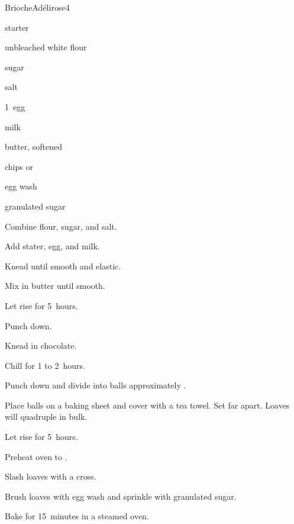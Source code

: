 \begin{recipe}{Brioche}{Ad\'elirose}{4}

\begin{ingredients}
\item {} starter
\item {} unbleached white flour
\item {} sugar
\item {} salt
\item 1~egg
\item {} milk
\item {} butter, softened
\item {}  chips or 
\item egg wash
\item granulated sugar
\end{ingredients}

\begin{directions}
\item Combine flour, sugar, and salt.
\item Add stater, egg, and milk.
\item Knead until smooth and elastic.
\item Mix in butter until smooth.
\item Let rise for 5~hours.
\item Punch down.
\item Knead in chocolate.
\item Chill for 1 to 2~hours.
\item Punch down and divide into balls approximately .
\item Place balls on a baking sheet and cover with a tea towel. Set far apart. Loaves will quadruple in bulk.
\item Let rise for 5~hours.
\item Preheat oven to .
\item Slash loaves with a cross.
\item Brush loaves with egg wash and sprinkle with granulated sugar.
\item Bake for 15~minutes in a steamed oven.
\end{directions}

\end{recipe}
